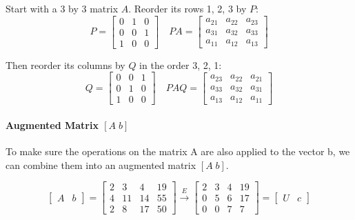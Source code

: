 Start with a 3 by 3 matrix $A$. Reorder its rows 1, 2, 3 by $P$:
\[
    P = \begin{bmatrix}
        0 & 1 & 0 \\
        0 & 0 & 1 \\
        1 & 0 & 0
    \end{bmatrix}
    \quad
    PA = \begin{bmatrix}
        a_{21} & a_{22} & a_{23} \\
        a_{31} & a_{32} & a_{33} \\
        a_{11} & a_{12} & a_{13}
    \end{bmatrix}
\]

\noindent Then reorder its columns by $Q$ in the order 3, 2, 1:
\[
    Q =
    \begin{bmatrix}
        0 & 0 & 1 \\
        0 & 1 & 0 \\
        1 & 0 & 0
    \end{bmatrix}
    \quad
    PAQ =
    \begin{bmatrix}
        a_{23} & a_{22} & a_{21} \\
        a_{33} & a_{32} & a_{31} \\
        a_{13} & a_{12} & a_{11}
    \end{bmatrix}
\]

\paragraph{Augmented Matrix $[A \; b]$}

To make sure the operations on the matrix A are also applied to the vector b, we can combine them into an augmented matrix $[A \; b]$.

\[
    \begin{bmatrix}
        A & b
    \end{bmatrix} =
    \begin{bmatrix}
        2 & 3  & 4  & 19 \\
        4 & 11 & 14 & 55 \\
        2 & 8  & 17 & 50
    \end{bmatrix}
    \xrightarrow{E}
    \begin{bmatrix}
        2 & 3 & 4 & 19 \\
        0 & 5 & 6 & 17 \\
        0 & 0 & 7 & 7
    \end{bmatrix}
    =
    \begin{bmatrix}
        U & c
    \end{bmatrix}
\]

